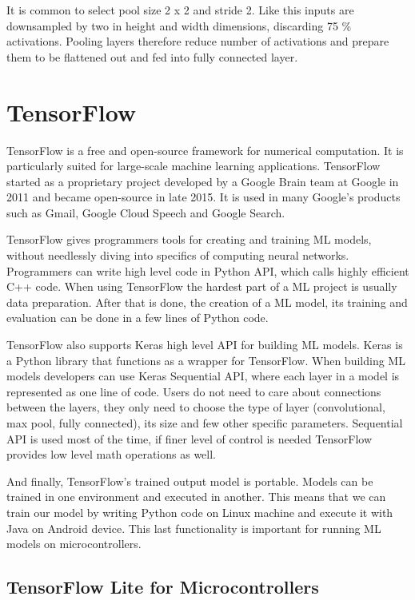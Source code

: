 It is common to select pool size 2 x 2 and stride 2.
Like this inputs are downsampled by two in height and width dimensions, discarding 75 \% activations.
Pooling layers therefore reduce number of activations and prepare them to be flattened out and fed into fully connected layer.

\section{ TensorFlow}

TensorFlow is a free and open-source framework for numerical computation.
It is particularly suited for large-scale machine learning applications\cite{geron}.
TensorFlow started as a proprietary project developed by a Google Brain team at Google in 2011 and became open-source in late 2015.
It is used in many Google's products such as Gmail, Google Cloud Speech and Google Search.

TensorFlow gives programmers tools for creating and training ML models, without needlessly diving into specifics of computing neural networks.
Programmers can write high level code in Python API, which calls highly efficient C++ code.
When using TensorFlow the hardest part of a ML project is usually data preparation.
After that is done, the creation of a ML model, its training and evaluation can be done in a few lines of Python code.

TensorFlow also supports Keras high level API for building ML models. 
Keras is a Python library that functions as a wrapper for TensorFlow.
When building ML models developers can use Keras Sequential API, where each layer in a model is represented as one line of code.
Users do not need to care about connections between the layers, they only need to choose the type of layer (convolutional, max pool, fully connected), its size and few other specific parameters.
Sequential API is used most of the time, if finer level of control is needed TensorFlow provides low level math operations as well.

And finally, TensorFlow's trained output model is portable\cite{geron}.
Models can be trained in one environment and executed in another.
This means that we can train our model by writing Python code on Linux machine and execute it with Java on Android device.
This last functionality is important for running ML models on microcontrollers.

\subsection{ TensorFlow Lite for Microcontrollers}

